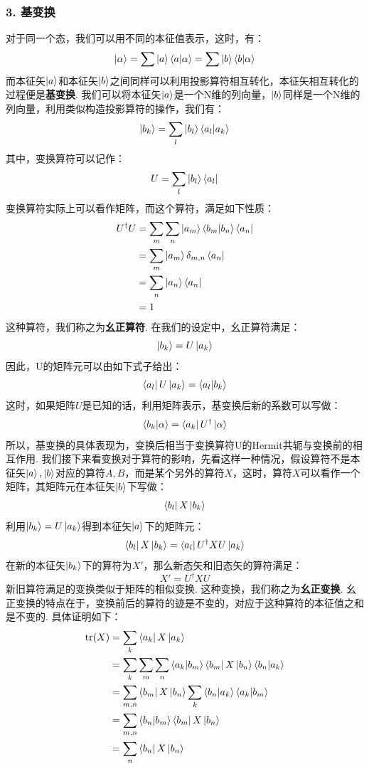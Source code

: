 \subsubsection{3. 基变换}
对于同一个态，我们可以用不同的本征值表示，这时，有：
\[
\ket{\alpha} = \sum\ket{a}\bra{a}\ket{\alpha} = \sum\ket{b}\bra{b}\ket{\alpha}
\]
而本征矢\(\ket{a}\)和本征矢\(\ket{b}\)之间同样可以利用投影算符相互转化，本征矢相互转化的过程便是\textbf{基变换}. 我们可以将本征矢\(\ket{a}\)是一个N维的列向量，\(\ket{b}\)同样是一个N维的列向量，利用类似构造投影算符的操作，我们有：
\[
\ket{b_{k}} = \sum_{l}\ket{b_{l}}\bra{a_{l}}\ket{a_{k}}
\]
其中，变换算符可以记作：
\[
U = \sum_{l}\ket{b_{l}}\bra{a_{l}}
\]
变换算符实际上可以看作矩阵，而这个算符，满足如下性质：
\begin{align*}
U^{\dagger}U
& = \sum_{m}\sum_{n}\ket{a_{m}}\bra{b_{m}}\ket{b_{n}}\bra{a_{n}} \\
& = \sum_{m}\ket{a_{m}}\delta_{m,n}\bra{a_{n}} \\
& = \sum_{n}\ket{a_{n}}\bra{a_{n}} \\
& = 1
\end{align*}
这种算符，我们称之为\textbf{幺正算符}. 在我们的设定中，幺正算符满足：
\[
\ket{b_{k}} = U\ket{a_{k}}
\]
因此，U的矩阵元可以由如下式子给出：
\[
\bra{a_{l}}U\ket{a_{k}} = \bra{a_{l}}\ket{b_{k}}
\]
这时，如果矩阵\(U\)是已知的话，利用矩阵表示，基变换后新的系数可以写做：
\[
\bra{b_{k}}\ket{\alpha} = \bra{a_{k}}U^{\dagger}\ket{\alpha}
\]
所以，基变换的具体表现为，变换后相当于变换算符U的Hermit共轭与变换前的相互作用. 我们接下来看变换对于算符的影响，先看这样一种情况，假设算符不是本征矢\(\ket{a},\ket{b}\)对应的算符\(A,B\)，而是某个另外的算符\(X\)，这时，算符\(X\)可以看作一个矩阵，其矩阵元在本征矢\(\ket{b}\)下写做：
\[
\bra{b_{l}}X\ket{b_{k}}
\]
利用\(\ket{b_{k}} = U\ket{a_{k}}\)得到本征矢\(\ket{a}\)下的矩阵元：
\[
\bra{b_{l}}X\ket{b_{k}} = \bra{a_{l}}U^{\dagger}XU\ket{a_{k}}
\]
在新的本征矢\(\ket{b_{k}}\)下的算符为\(X'\)，那么新态矢和旧态矢的算符满足：
\[
X' = U^{\dagger}XU
\]
新旧算符满足的变换类似于矩阵的相似变换. 这种变换，我们称之为\textbf{幺正变换}. 幺正变换的特点在于，变换前后的算符的迹是不变的，对应于这种算符的本征值之和是不变的. 具体证明如下：
\begin{align*}
\mathrm{tr}(X) 
& = \sum_{k}\bra{a_{k}}X\ket{a_{k}} \\
& = \sum_{k}\sum_{m}\sum_{n}\bra{a_{k}}\ket{b_{m}}\bra{b_{m}}X\ket{b_{n}}\bra{b_{n}}\ket{a_{k}} \\
& = \sum_{m,n}\bra{b_{m}}X\ket{b_{n}}\sum_{k}\bra{b_{n}}\ket{a_{k}}\bra{a_{k}}\ket{b_{m}} \\
& = \sum_{m,n}\bra{b_{n}}\ket{b_{m}}\bra{b_{m}}X\ket{b_{n}} \\
& = \sum_{n}\bra{b_{n}}X\ket{b_{n}}
\end{align*}
